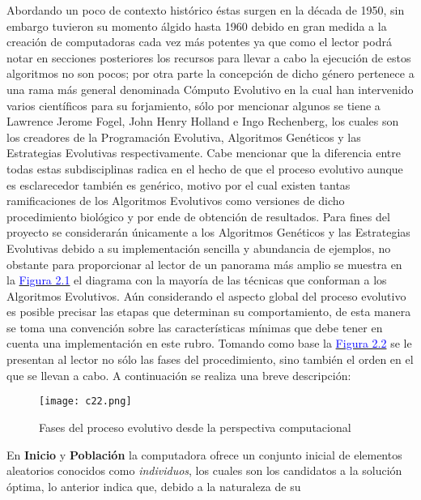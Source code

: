 \documentclass[class=report, crop=false]{standalone}
\begin{document}
Abordando un poco de contexto histórico éstas surgen en la década 
de 1950, sin embargo tuvieron su momento álgido hasta 1960 debido 
en gran medida a la creación de computadoras cada vez más potentes 
ya que como el lector podrá notar en secciones posteriores los 
recursos para llevar a cabo la ejecución de estos algoritmos no 
son pocos; por otra parte la concepción de dicho género pertenece 
a una rama más general denominada Cómputo Evolutivo en la cual 
han intervenido varios científicos para su forjamiento, sólo por 
mencionar algunos se tiene a Lawrence Jerome Fogel, John Henry 
Holland e Ingo Rechenberg, los cuales son los creadores de la 
Programación Evolutiva, Algoritmos Genéticos y las Estrategias 
Evolutivas respectivamente.\medskip\break
Cabe mencionar que la diferencia entre todas estas subdisciplinas 
radica en el hecho de que el proceso evolutivo aunque es esclarecedor 
también es genérico, motivo por el cual existen tantas ramificaciones 
de los Algoritmos Evolutivos como versiones de dicho procedimiento 
biológico y por ende de obtención de resultados.\medskip\break
Para fines del proyecto se considerarán únicamente a los Algoritmos 
Genéticos y las Estrategias Evolutivas debido a su implementación 
sencilla y abundancia de ejemplos, no obstante para proporcionar 
al lector de un panorama más amplio se muestra en la \hyperref[sec:c2_1]{\textcolor{blue}{Figura 2.1}} 
el diagrama con la mayoría de las técnicas que conforman a los 
Algoritmos Evolutivos.\medskip\break
Aún considerando el aspecto global del proceso evolutivo es 
posible precisar las etapas que determinan su comportamiento, 
de esta manera se toma una convención sobre las características 
mínimas que debe tener en cuenta una implementación en este 
rubro.\break
Tomando como base la \hyperref[sec:c2_2]{\textcolor{blue}{Figura 2.2}} 
se le presentan al lector no sólo las fases del procedimiento, 
sino también el orden en el que se llevan a cabo. A continuación 
se realiza una breve descripción:\medskip
\begin{figure}[ht]
\label{sec:c2_2}
\centering
\texttt{[image: c22.png]}
\caption{Fases del proceso evolutivo desde la perspectiva computacional}
\end{figure}\break
En \textbf{Inicio} y \textbf{Población} la computadora ofrece 
un conjunto inicial de elementos aleatorios conocidos como 
\textit{individuos}, los cuales son los candidatos a la solución 
óptima, lo anterior indica que, debido a la naturaleza de su 
\end{document}
